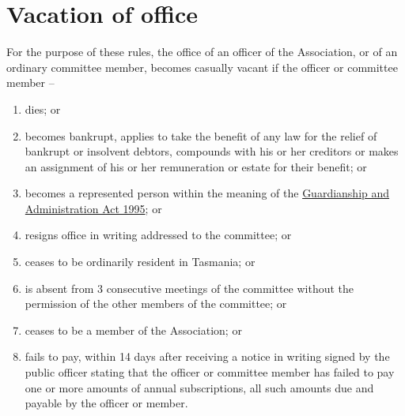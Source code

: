 \section{Vacation of office}
\label{rule:vacation}

For the purpose of these rules, the office of an officer of the Association, or of an ordinary committee member, becomes casually vacant if the officer or committee member --
\begin{enumerate}
	\item dies; or
	\item becomes bankrupt, applies to take the benefit of any law for the relief of bankrupt or insolvent debtors, compounds with his or her creditors or makes an assignment of his or her remuneration or estate for their benefit; or
	\item becomes a represented person within the meaning of the \href{https://www.legislation.tas.gov.au/view/html/inforce/current/act-1995-044}{Guardianship and Administration Act 1995}; or
	\item resigns office in writing addressed to the committee; or
	\item ceases to be ordinarily resident in Tasmania; or
	\item is absent from 3 consecutive meetings of the committee without the permission of the other members of the committee; or
	\item ceases to be a member of the Association; or
	\item fails to pay, within 14 days after receiving a notice in writing signed by the public officer stating that the officer or committee member has failed to pay one or more amounts of annual subscriptions, all such amounts due and payable by the officer or member.
\end{enumerate}